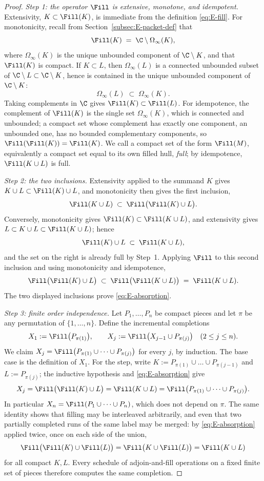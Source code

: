 \begin{proof}
\emph{Step 1: the operator $\Fill$ is extensive, monotone, and idempotent.}
Extensivity, $K\subset\Fill(K)$, is immediate from the definition
\eqref{eq:E-fill}. For monotonicity, recall from Section~\ref{subsec:E-packet-def}
that
\[
\Fill(K)\;=\;\C\setminus\Omega_\infty(K),
\]
where $\Omega_\infty(K)$ is the unique unbounded component of $\C\setminus K$, and
that $\Fill(K)$ is compact. If $K\subset L$, then $\Omega_\infty(L)$ is a connected
unbounded subset of $\C\setminus L\subset\C\setminus K$, hence is contained in the
unique unbounded component of $\C\setminus K$:
\[
\Omega_\infty(L)\;\subset\;\Omega_\infty(K).
\]
Taking complements in $\C$ gives $\Fill(K)\subset\Fill(L)$. For idempotence, the
complement of $\Fill(K)$ is the single set $\Omega_\infty(K)$, which is connected and
unbounded; a compact set whose complement has exactly one component, an unbounded
one, has no bounded complementary components, so $\Fill(\Fill(K))=\Fill(K)$. We call
a compact set of the form $\Fill(M)$, equivalently a compact set equal to its own
filled hull, \emph{full}; by idempotence, $\Fill(K\cup L)$ is full.

\emph{Step 2: the two inclusions.}
Extensivity applied to the summand $K$ gives $K\cup L\subset\Fill(K)\cup L$, and
monotonicity then gives the first inclusion,
\[
\Fill(K\cup L)\;\subset\;\Fill\bigl(\Fill(K)\cup L\bigr).
\]
Conversely, monotonicity gives $\Fill(K)\subset\Fill(K\cup L)$, and extensivity gives
$L\subset K\cup L\subset\Fill(K\cup L)$; hence
\[
\Fill(K)\cup L\;\subset\;\Fill(K\cup L),
\]
and the set on the right is already full by Step~1. Applying $\Fill$ to this second
inclusion and using monotonicity and idempotence,
\[
\Fill\bigl(\Fill(K)\cup L\bigr)\;\subset\;\Fill\bigl(\Fill(K\cup L)\bigr)
\;=\;\Fill(K\cup L).
\]
The two displayed inclusions prove \eqref{eq:E-absorption}.

\emph{Step 3: finite order independence.}
Let $P_1,\dots,P_n$ be compact pieces and let $\pi$ be any permutation of
$\{1,\dots,n\}$. Define the incremental completions
\[
X_1:=\Fill\bigl(P_{\pi(1)}\bigr),
\qquad
X_j:=\Fill\bigl(X_{j-1}\cup P_{\pi(j)}\bigr)\quad(2\le j\le n).
\]
We claim $X_j=\Fill\bigl(P_{\pi(1)}\cup\dots\cup P_{\pi(j)}\bigr)$ for every $j$, by
induction. The base case is the definition of $X_1$. For the step, write
$K:=P_{\pi(1)}\cup\dots\cup P_{\pi(j-1)}$ and $L:=P_{\pi(j)}$; the inductive
hypothesis and \eqref{eq:E-absorption} give
\[
X_j=\Fill\bigl(\Fill(K)\cup L\bigr)=\Fill(K\cup L)
=\Fill\bigl(P_{\pi(1)}\cup\dots\cup P_{\pi(j)}\bigr).
\]
In particular $X_n=\Fill(P_1\cup\dots\cup P_n)$, which does not depend on $\pi$. The
same identity shows that filling may be interleaved arbitrarily, and even that two
partially completed runs of the same label may be merged: by
\eqref{eq:E-absorption} applied twice, once on each side of the union,
\[
\Fill\bigl(\Fill(K)\cup\Fill(L)\bigr)
=\Fill\bigl(K\cup\Fill(L)\bigr)
=\Fill(K\cup L)
\]
for all compact $K,L$. Every schedule of adjoin-and-fill operations on a fixed finite
set of pieces therefore computes the same completion.
\end{proof}

